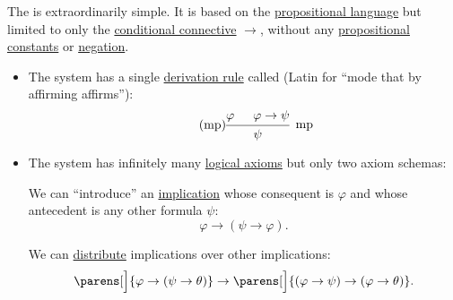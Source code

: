 \begin{definition}\label{def:positive_implicational_propositional_derivation_system}
  The  is extraordinarily simple. It is based on the \hyperref[def:propositional_language]{propositional language} but limited to only the \hyperref[def:propositional_language/connectives/conditional]{conditional connective} \( \rightarrow \), without any \hyperref[def:propositional_language/constants]{propositional constants} or \hyperref[def:propositional_language/negation]{negation}.

  \begin{itemize}
    \item The system has a single \hyperref[def:first_order_axiomatic_derivation_system/rules]{derivation rule} called  (Latin for \enquote{mode that by affirming affirms}):
    \begin{equation}\label{eq:def:implicational_logic/rules/modus_ponens}\tag{mp}
      \begin{prooftree}
        \hypo{\varphi}
        \hypo{\varphi \rightarrow \psi}
        \infer2[mp]{\psi}
      \end{prooftree}
    \end{equation}

    \item The system has infinitely many \hyperref[def:first_order_axiomatic_derivation_system/logical]{logical axioms} but only two axiom schemas:
    \begin{thmenum}
       We can \enquote{introduce} an \hyperref[def:material_implication]{implication} whose consequent is \( \varphi \) and whose antecedent is any other formula \( \psi \):
      \begin{equation}\label{eq:def:positive_implicational_propositional_derivation_system/axioms/imp_intro}
        \varphi \rightarrow (\psi \rightarrow \varphi).
      \end{equation}

       We can \hyperref[def:semiring/distributivity]{distribute} implications over other implications:
      \begin{equation}\label{eq:def:positive_implicational_propositional_derivation_system/axioms/imp_distr}
        \parens[\Big]{ \varphi \rightarrow (\psi \rightarrow \theta) } \rightarrow \parens[\Big]{ (\varphi \rightarrow \psi) \rightarrow (\varphi \rightarrow \theta)}.
      \end{equation}
    \end{thmenum}
  \end{itemize}


\end{definition}
